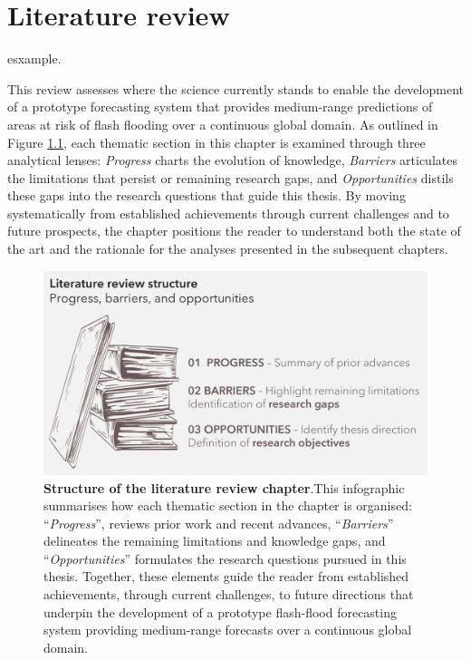 \chapter{Literature review}
\label{literature_review}
\graphicspath{{chapter_02/figures}{chapter_02/tables}}



\citep{Abegaz_2024} esxample.

This review assesses where the science currently stands to enable the development of a prototype forecasting system that provides medium-range predictions of areas at risk of flash flooding over a continuous global domain. As outlined in Figure \ref{fig:literature_structure}, each thematic section in this chapter is examined through three analytical lenses: \textit{Progress} charts the evolution of knowledge, \textit{Barriers} articulates the limitations that persist or remaining research gaps, and \textit{Opportunities} distils these gaps into the research questions that guide this thesis. By moving systematically from established achievements through current challenges and to future prospects, the chapter positions the reader to understand both the state of the art and the rationale for the analyses presented in the subsequent chapters.

\begin{figure}[htbp]
\centering
\includegraphics[scale=1.04]{Figures/Chapter_02/literature_structure.png}
\caption{\textbf{Structure of the literature review chapter}.This infographic summarises how each thematic section in the chapter is organised: “\textit{Progress}”, reviews prior work and recent advances, “\textit{Barriers}” delineates the remaining limitations and knowledge gaps, and “\textit{Opportunities}” formulates the research questions pursued in this thesis. Together, these elements guide the reader from established achievements, through current challenges, to future directions that underpin the development of a prototype flash-flood forecasting system providing medium-range forecasts over a continuous global domain.}
\label{fig:literature_structure}
\end{figure}


